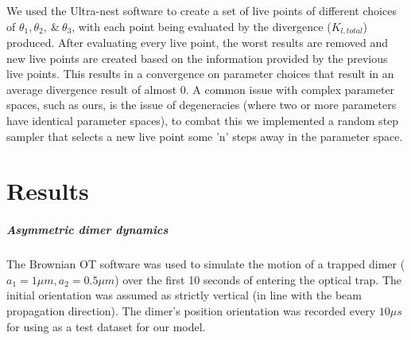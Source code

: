 \documentclass[11pt]{article}
\begin{document}
	We used the Ultra-nest software to create a set of live points of different choices of $\theta_1, \theta_2, \ \& \ \theta_3$, with each point being evaluated by the divergence ($K_{l, total}$) produced. After evaluating every live point, the worst results are removed and new live points are created based on the information provided by the previous live points. This results in a convergence on parameter choices that result in an average divergence result of almost 0. A common issue with complex parameter spaces, such as ours, is the issue of degeneracies (where two or more parameters have identical parameter spaces), to combat this we implemented a random step sampler that selects a new live point some 'n' steps away in the parameter space.
	
	\section*{Results}
	\subparagraph*{Asymmetric dimer dynamics}
	The Brownian OT software was used to simulate the motion of a trapped dimer ($a_1=1\mu m, a_2=0.5\mu m$) over the first 10 seconds of entering the optical trap. The initial orientation was assumed as strictly vertical (in line with the beam propagation direction). The dimer's position orientation was recorded every $10 \mu s$ for using as a test dataset for our model. 
	
\end{document}
